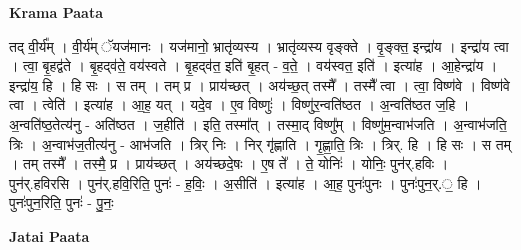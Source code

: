 \documentclass[17pt]{extarticle}
\begin{document}
\textbf{Krama Paata} \newline

तद् वी॒र्य᳚म् । वी॒र्य॑म् ॅयज॑मानः । यज॑मानो॒ भ्रातृ॑व्यस्य । भ्रातृ॑व्यस्य वृङ्‍क्ते । वृ॒ङ्‍क्त॒ इन्द्रा॑य । इन्द्रा॑य त्वा । त्वा॒ बृ॒हद्व॑ते । बृ॒हद्‍व॑ते॒ वय॑स्वते । बृ॒हद्‍व॑त॒ इति॑ बृ॒हत् - व॒ते॒ । वय॑स्वत॒ इति॑ । इत्या॑ह । आ॒हेन्द्रा॑य । इन्द्रा॑य॒ हि । हि सः । स तम् । तम् प्र । प्राय॑च्छत् । अय॑च्छ॒त् तस्मै᳚ । तस्मै᳚ त्वा । त्वा॒ विष्ण॑वे । विष्ण॑वे त्वा । त्वेति॑ । इत्या॑ह । आ॒ह॒ यत् । यदे॒व । ए॒व विष्णुः॑ । विष्णु॑र॒न्वति॑ष्ठत । अ॒न्वति॑ष्ठत ज॒हि । अ॒न्वति॑ष्ठ॒तेत्य॑नु - अति॑ष्ठत । ज॒हीति॑ । इति॒ तस्मा᳚त् । तस्मा॒द् विष्णु᳚म् । विष्णु॑म॒न्वाभ॑जति । अ॒न्वाभ॑जति॒ त्रिः । अ॒न्वाभ॑ज॒तीत्य॑नु - आभ॑जति । त्रिर् निः । निर् गृ॑ह्णाति । गृ॒ह्णा॒ति॒ त्रिः । त्रिर्. हि । हि सः । स तम् । तम् तस्मै᳚ । तस्मै॒ प्र । प्राय॑च्छत् । अय॑च्छदे॒षः । ए॒ष ते᳚ । ते॒ योनिः॑ । योनिः॒ पुन॑र्.हविः । पुन॑र्.हविरसि । पुन॑र्.हवि॒रिति॒ पुनः॑ - ह॒विः॒ । अ॒सीति॑ । इत्या॑ह । आ॒ह॒ पुनः॑पुनः । पुनः॑पुन॒र्.॒ हि । पुनः॑पुन॒रिति॒ पुनः॑ - पु॒नः॒ \newline

\textbf{Jatai Paata} \newline
\end{document}
